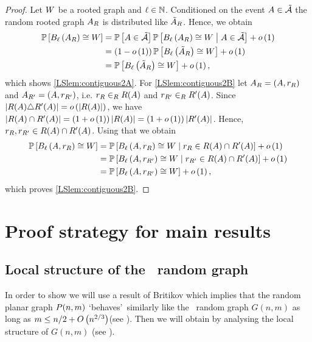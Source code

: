 \begin{proof}
Let $W$ be a rooted graph and $\ell\in\mathbb{N}$. Conditioned on the event $A\in\tilde{\mathcal{A}}$ the random rooted graph $A_R$ is distributed like $\tilde{A}_{R}$. Hence, we obtain
\begin{align*}
\mathbb{P}\left[B_{\ell}\left(A_{R}\right)\cong W\right]&=\mathbb{P}\left[A\in \tilde{\mathcal{A}}\right]\mathbb{P}\left[B_{\ell}\left(A_{R}\right)\cong W \;\middle|\; A\in \tilde{\mathcal{A}}\right]+o\left(1\right)
\\
&=\left(1-o\left(1\right)\right)\mathbb{P}\left[B_{\ell}\left(\tilde{A}_{R}\right)\cong W\right]+o\left(1\right)
\\
&=\mathbb{P}\left[B_{\ell}\left(\tilde{A}_{R}\right)\cong W\right]+o\left(1\right),
\end{align*}
which shows \ref{LSlem:contiguous2A}. For \ref{LSlem:contiguous2B} let $A_R=\left(A, r_{R}\right)$ and $A_{R'}=\left(A, r_{R'}\right)$, i.e. $r_{R}\in_RR(A)$ and $r_{R'}\in_RR'(A)$. Since \whp\ $\left|R(A)\triangle R'(A)\right|=o\left(\left|R(A)\right|\right)$, we have \whp\ $\left|R(A)\cap R'(A)\right|=\left(1+o\left(1\right)\right)\left|R(A)\right|=\left(1+o\left(1\right)\right)\left|R'(A)\right|$. Hence, \whp\ $r_{R}, r_{R'}\in R(A)\cap R'(A)$. Using that we obtain
\begin{align*}
\mathbb{P}\left[B_{\ell}\left(A, r_{R}\right)\cong W\right]&=\mathbb{P}\left[B_{\ell}\left(A, r_{R}\right)\cong W \;\middle|\; r_{R}\in R(A)\cap R'(A)\right]+o\left(1\right)
\\
&=\mathbb{P}\left[B_{\ell}\left(A, r_{R'}\right)\cong W \;\middle|\; r_{R'}\in R(A)\cap R'(A)\right]+o\left(1\right)
\\
&=\mathbb{P}\left[B_{\ell}\left(A, r_{R'}\right)\cong W\right]+o\left(1\right),
\end{align*}
which proves \ref{LSlem:contiguous2B}.
\end{proof}


\section{Proof strategy for main results}\label{LSsec:strategy}
\subsection{Local structure of the \ER\ random graph}\label{LSsub:strategy_er}
In order to show  we will use a result of Britikov \cite{Britikov1989} which implies that the random planar graph $P(n,m)$ \lq behaves\rq\ similarly like the \ER\ random graph $G(n,m)$ as long as $m\leq n/2+O\left(n^{2/3}\right)$(see ). Then we will obtain  by analysing the local structure of $G(n,m)$ (see ).

